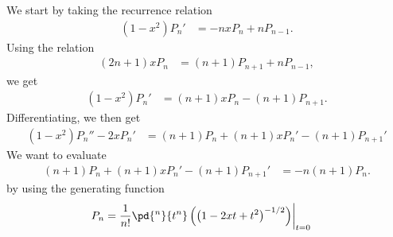 \documentclass[10pt]{mypackage}
\begin{document}
\RaggedRight
\begin{solution}[32.20]
  We start by taking the recurrence relation
  \begin{align*}
    \left( 1-x^2 \right)P_n' &= -nxP_n + nP_{n-1}.
  \end{align*}
  Using the relation
  \begin{align*}
    \left( 2n+1 \right)xP_n &= \left( n+1 \right)P_{n+1} + nP_{n-1},
  \end{align*}
  we get
  \begin{align*}
    \left( 1-x^2 \right)P_n' &= \left( n+1 \right)xP_n - \left( n+1 \right)P_{n+1}.
  \end{align*}
  Differentiating, we then get
  \begin{align*}
    \left( 1-x^2 \right)P_n'' - 2xP_n' &= \left( n+1 \right)P_n + \left( n+1 \right)xP_n' - \left( n+1 \right)P_{n+1}'
  \end{align*}
  We want to evaluate
  \begin{align*}
    \left( n+1 \right)P_n + \left( n+1 \right)xP_n' - \left( n+1 \right)P_{n+1}' &= -n\left( n+1 \right)P_n.
  \end{align*}
  by using the generating function
  \begin{align*}
    P_n &= \frac{1}{n!}\pd{^n}{t^n}\left( \left( 1-2xt + t^2 \right)^{-1/2} \right)\biggr\vert_{t=0}
  \end{align*}
  
\end{solution}
\begin{solution}[32.21]

\end{solution}
\begin{solution}[32.23]

\end{solution}
\begin{solution}[35.4]

\end{solution}
\begin{solution}[35.5]

\end{solution}
\begin{solution}[35.7]

\end{solution}
\begin{solution}[35.8]

\end{solution}
\begin{solution}[35.10]

\end{solution}
\begin{solution}[35.11]

\end{solution}
\begin{solution}[35.12]

\end{solution}
\begin{solution}[35.16]

\end{solution}
\begin{solution}[35.17 (c)]

\end{solution}
\begin{solution}[35.21]

\end{solution}
\begin{solution}[35.25]

\end{solution}
\end{document}
